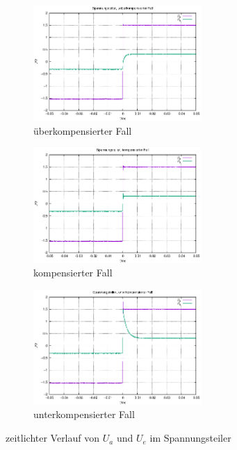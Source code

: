 \documentclass[10pt,a4paper]{scrartcl}
\begin{document}
\begin{figure}[!ht]
    \centering
    \begin{subfigure}{\textwidth}
        \centering
        \includegraphics[width=0.7\textwidth]
            {graphics/spannungsteiler_ueberkomp.eps}
        \caption{überkompensierter Fall}
    \end{subfigure}
    \begin{subfigure}{\textwidth}
        \centering
        \includegraphics[width=0.7\textwidth]
            {graphics/spannungsteiler_komp.eps}
        \caption{kompensierter Fall}
    \end{subfigure}
    \begin{subfigure}{\textwidth}
        \centering
        \includegraphics[width=0.7\textwidth]
            {graphics/spannungsteiler_unterkomp.eps}
        \caption{unterkompensierter Fall}
    \end{subfigure}
    \caption {zeitlichter Verlauf von $U_a$ und $U_e$ im Spannungsteiler}
    \label{fig:SPTplot}
\end{figure}
\end{document}
